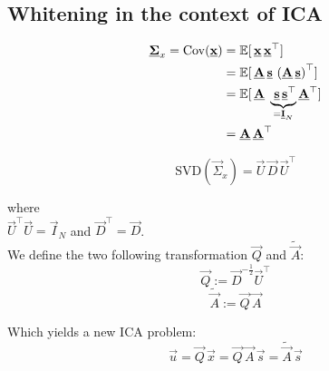 \subsection{Whitening in the context of ICA}

\begin{frame}

\begin{align}
\label{eq:expxina}
\underline{\mathbf{\Sigma}}_x = \mathrm{Cov}(\underline{\mathbf{x}}) &=  \mathbb{E} \lbrack \, \underline{\mathbf{x}} \, \underline{\mathbf{x}}^\top \rbrack\\
&=  \mathbb{E} \lbrack \, \underline{\mathbf{A}}\,\underline{\mathbf{s}} \, \left( \underline{\mathbf{A}}\,\underline{\mathbf{s}} \right)^\top \rbrack\\
&=  \mathbb{E} \lbrack \, \underline{\mathbf{A}}\; \underbrace{\;\underline{\mathbf{s}} \, \underline{\mathbf{s}}^\top}_{= \underline{\mathbf{I}}_N} \underline{\mathbf{A}}^\top \rbrack\\
\label{eq:sigmax}
&=  \underline{\mathbf{A}}\, \underline{\mathbf{A}}^\top
\end{align}

\end{frame}

\begin{frame}


\begin{equation}
\mathrm{SVD}(\vec \Sigma_x) = \vec U\, \vec D \, \vec U^\top
\end{equation}

where\\
 $\vec U^\top\vec U = \vec I_N$ and
$\vec D^\top = \vec D$.\\

We define the two following transformation $\vec Q$ and $\widetilde{\vec A}$:
\begin{equation}
\label{eq:defq}
\vec Q := \vec D^{-\frac{1}{2}} \vec U^\top
\end{equation}
\begin{equation}
\label{eq:defatilde}
\widetilde{\vec A} := \vec Q \, \vec A 
\end{equation}

Which yields a new ICA problem:
\begin{equation}
\vec u = \vec Q\, \vec x = \vec Q\,\vec A \, \vec s = \widetilde{\vec A} \, \vec s
\end{equation}

 \\

\end{frame}

